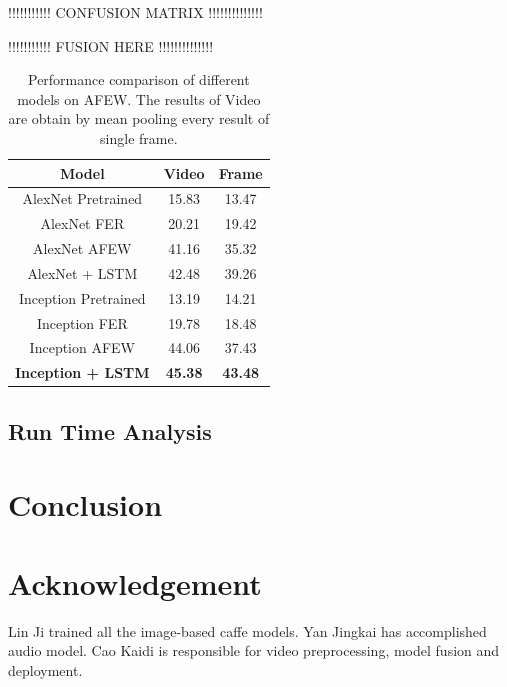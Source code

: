 \documentclass[10pt,twocolumn,letterpaper]{article}
\begin{document}
!!!!!!!!!!! CONFUSION MATRIX !!!!!!!!!!!!!!


!!!!!!!!!!! FUSION HERE !!!!!!!!!!!!!!



\begin{table}[t]
\begin{center}
\begin{tabular}{|c|c|c|}
\hline
\textbf{Model} & \textbf{Video} & \textbf{Frame} \\
\hline\hline
AlexNet Pretrained & 15.83 & 13.47 \\
AlexNet FER & 20.21 & 19.42 \\
AlexNet AFEW & 41.16 &  35.32 \\
AlexNet + LSTM & 42.48 & 39.26  \\ 
\hline \hline 
Inception Pretrained & 13.19 & 14.21 \\
Inception FER & 19.78 & 18.48 \\
Inception AFEW & 44.06 & 37.43 \\
\textbf{Inception + LSTM} & \textbf{45.38} & \textbf{43.48} \\


\hline
\end{tabular}
\end{center}
\caption{Performance comparison of different models on AFEW. The results of Video are obtain by mean pooling every result of single frame.}
\label{tableResult}

\end{table}




\subsection{Run Time Analysis}


\section{Conclusion}

\section{Acknowledgement}

Lin Ji trained all the image-based caffe models. Yan Jingkai has accomplished audio model. Cao Kaidi is responsible for video preprocessing, model fusion and deployment.

{\small


}
\end{document}
